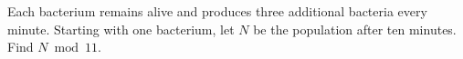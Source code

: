 Each bacterium remains alive and produces three additional bacteria every minute. Starting with one bacterium, let $N$ be the population after ten minutes. Find $N\bmod11$.
